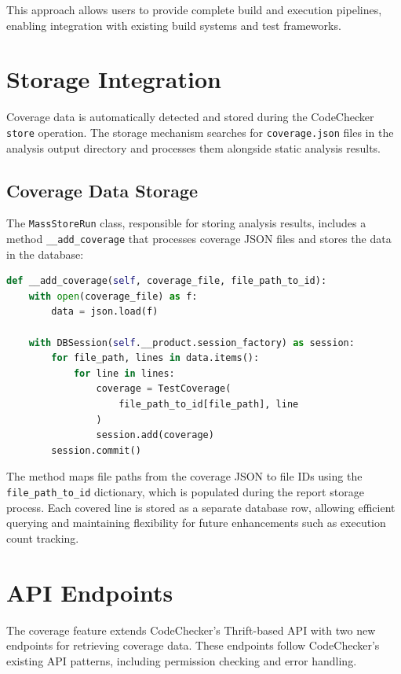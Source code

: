 This approach allows users to provide complete build and execution pipelines, enabling integration with existing build systems and test frameworks.

\section{Storage Integration}

Coverage data is automatically detected and stored during the CodeChecker \texttt{store} operation. The storage mechanism searches for \texttt{coverage.json} files in the analysis output directory and processes them alongside static analysis results.

\subsection{Coverage Data Storage}

The \texttt{MassStoreRun} class, responsible for storing analysis results, includes a method \texttt{\_\_add\_coverage} that processes coverage JSON files and stores the data in the database:

\begin{lstlisting}[language=Python, caption={Coverage data storage implementation}]
def __add_coverage(self, coverage_file, file_path_to_id):
    with open(coverage_file) as f:
        data = json.load(f)
    
    with DBSession(self.__product.session_factory) as session:
        for file_path, lines in data.items():
            for line in lines:
                coverage = TestCoverage(
                    file_path_to_id[file_path], line
                )
                session.add(coverage)
        session.commit()
\end{lstlisting}

The method maps file paths from the coverage JSON to file IDs using the \texttt{file\_path\_to\_id} dictionary, which is populated during the report storage process. Each covered line is stored as a separate database row, allowing efficient querying and maintaining flexibility for future enhancements such as execution count tracking.

\section{API Endpoints}

The coverage feature extends CodeChecker's Thrift-based API with two new endpoints for retrieving coverage data. These endpoints follow CodeChecker's existing API patterns, including permission checking and error handling.


